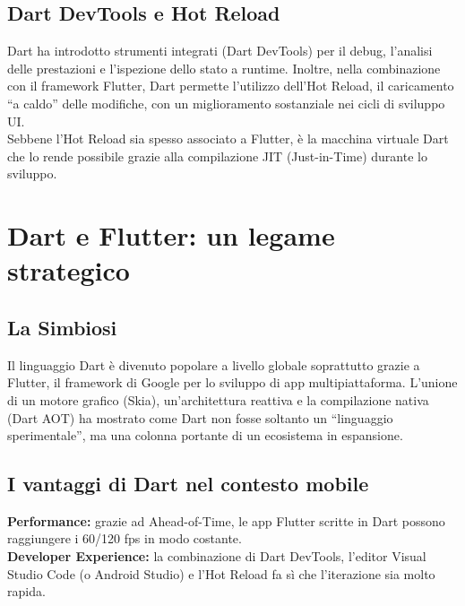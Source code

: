 \documentclass[14pt]{extbook}
\begin{document}
\subsection{Dart DevTools e Hot Reload}
Dart ha introdotto strumenti integrati (Dart DevTools) per il debug, l’analisi delle prestazioni e l’ispezione dello stato a runtime. Inoltre, nella combinazione con il framework Flutter, Dart permette l’utilizzo dell’Hot Reload, il caricamento “a caldo” delle modifiche, con un miglioramento sostanziale nei cicli di sviluppo UI.\\

Sebbene l’Hot Reload sia spesso associato a Flutter, è la macchina virtuale Dart che lo rende possibile grazie alla compilazione JIT (Just-in-Time) durante lo sviluppo.\\

\section{Dart e Flutter: un legame strategico}
\subsection{La Simbiosi}
Il linguaggio Dart è divenuto popolare a livello globale soprattutto grazie a Flutter, il framework di Google per lo sviluppo di app multipiattaforma. L’unione di un motore grafico (Skia), un’architettura reattiva e la compilazione nativa (Dart AOT) ha mostrato come Dart non fosse soltanto un “linguaggio sperimentale”, ma una colonna portante di un ecosistema in espansione.
\subsection{I vantaggi di Dart nel contesto mobile}
\textbf{Performance:} grazie ad Ahead-of-Time, le app Flutter scritte in Dart possono raggiungere i 60/120 fps in modo costante.\\
\textbf{Developer Experience:} la combinazione di Dart DevTools, l’editor Visual Studio Code (o Android Studio) e l’Hot Reload fa sì che l’iterazione sia molto rapida.\\
\pagebreak
\end{document}
